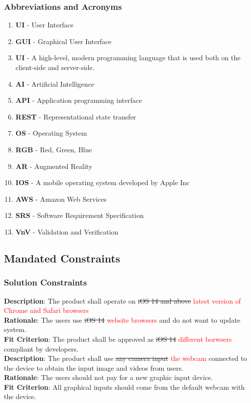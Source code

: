 \documentclass[12pt]{article}
\begin{document}
\subsubsection{Abbreviations and Acronyms}
\begin{enumerate}
\item \textbf{UI} - User Interface
\item \textbf{GUI} - Graphical User Interface
\item \textbf{UI} - A high-level, modern programming language that is used both on the client-side and server-side.
\item \textbf{AI} - Artificial Intelligence
\item \textbf{API} - Application programming interface
\item \textbf{REST} - Representational state transfer
\item \textbf{OS} - Operating System
\item \textbf{RGB} - Red, Green, Blue
\item \textbf{AR} - Augmented Reality
\item \textbf{IOS} - A mobile operating system developed by Apple Inc
\item \textbf{AWS} - Amazon Web Services
\item \textbf{SRS} - Software Requirement Specification
\item \textbf{VnV} - Validation and Verification
\end{enumerate}

\subsection{Mandated Constraints}
\subsubsection{Solution Constraints}
\textbf{Description}: The product shall operate on \sout{iOS 14 and above} \textcolor{red}{latest version of Chrome and Safari browsers} \\
\textbf{Rationale}: The users use \sout{iOS 14} \textcolor{red}{website browsers} and do not want to update system. \\
\textbf{Fit Criterion}: The product shall be approved as \sout{iOS 14} \textcolor{red}{different borwsers} compliant by developers. \\
\newline
\textbf{Description}: The product shall use \sout{any camera input} \textcolor{red}{the webcam} connected to the device to obtain the input image and videos from users. \\
\textbf{Rationale}: The users should not pay for a new graphic input device. \\
\textbf{Fit Criterion}: All graphical inputs should come from the default webcam with the device. \\
\end{document}
